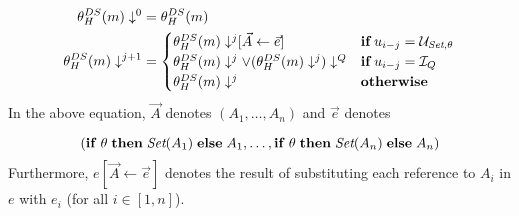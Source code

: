 \begin{align*}
  {\theta_{H}^{DS}(m)}\downarrow^{0}                                                 & = \theta_{H}^{DS}(m)                            \\
  {\theta_{H}^{DS}(m)}\downarrow^{j+1}                                               & =
                                    \begin{cases}
                                      {{\theta_{H}^{DS}(m)}\downarrow^{j}}[\vec{A} \gets \vec{e}] & \mathbf{if}\, u_{i-j} = \mathcal{U}_{\textit{Set},\theta} \\
                                      {\theta_{H}^{DS}(m)}\downarrow^{j} \lor ({\theta_{H}^{DS}(m)}\downarrow^{j})\downarrow^{Q} &\mathbf{if}\, u_{i-j} = \mathcal{I}_{Q}\\
                                      {\theta_{H}^{DS}(m)}\downarrow^{j}             & \mathbf{otherwise}                           \\
                                    \end{cases}
\end{align*}
In the above equation, $\vec{A}$ denotes $(A_1, \ldots, A_n)$ and $\vec{e}$ denotes

\[
  (\mathbf{if}\thickspace \theta \thickspace \mathbf{then} \thickspace \textit{Set}(A_1) \thickspace \mathbf{else} \thickspace A_1,\ldots, \mathbf{if}\thickspace \theta \thickspace \mathbf{then} \thickspace \textit{Set}(A_n) \thickspace \mathbf{else} \thickspace A_n)
\]
Furthermore, $e[\vec{A} \gets \vec{e}]$ denotes the result of substituting each reference to $A_i$ in $e$ with $e_i$ (for all $i \in [1,n]$).


\iftechreport{

}



